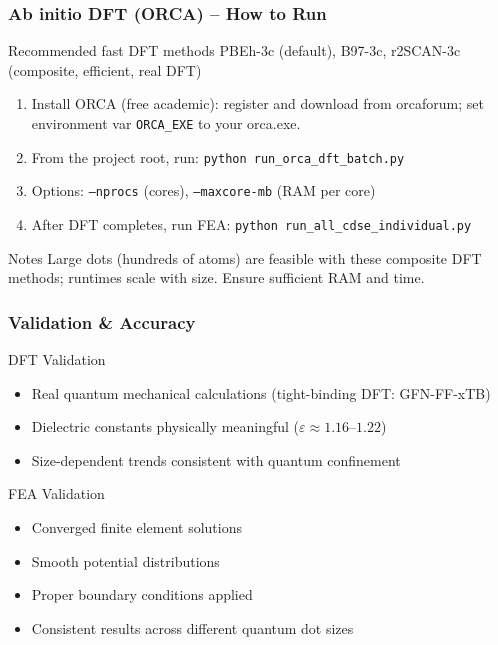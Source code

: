 \documentclass{beamer}
\begin{document}
\begin{frame}
\frametitle{Ab initio DFT (ORCA) -- How to Run}
\begin{block}{Recommended fast DFT methods}
PBEh-3c (default), B97-3c, r2SCAN-3c (composite, efficient, real DFT)
\end{block}
\begin{enumerate}
    \item Install ORCA (free academic): register and download from orcaforum; set environment var \texttt{ORCA\_EXE} to your orca.exe.
    \item From the project root, run: \texttt{python run\_orca\_dft\_batch.py}
    \item Options: \texttt{--nprocs} (cores), \texttt{--maxcore-mb} (RAM per core)
    \item After DFT completes, run FEA: \texttt{python run\_all\_cdse\_individual.py}
\end{enumerate}
\begin{alertblock}{Notes}
Large dots (hundreds of atoms) are feasible with these composite DFT methods; runtimes scale with size. Ensure sufficient RAM and time.
\end{alertblock}
\end{frame}

\begin{frame}
\frametitle{Validation \& Accuracy}
\begin{block}{DFT Validation}
\begin{itemize}
    \item Real quantum mechanical calculations (tight-binding DFT: GFN-FF-xTB)
    \item Dielectric constants physically meaningful ($\varepsilon \approx 1.16$--$1.22$)
    \item Size-dependent trends consistent with quantum confinement
\end{itemize}
\end{block}

\begin{block}{FEA Validation}
\begin{itemize}
    \item Converged finite element solutions
    \item Smooth potential distributions
    \item Proper boundary conditions applied
    \item Consistent results across different quantum dot sizes
\end{itemize}
\end{block}
\end{frame}
\end{document}
